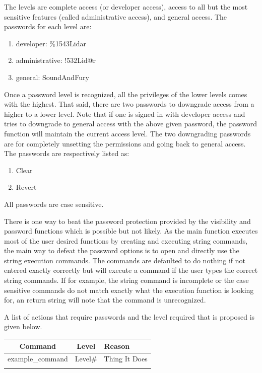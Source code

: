 The levels are complete access (or developer access), access to all but the most sensitive features (called administrative access), and general access. The passwords for each level are:

\begin{enumerate}
\item{developer: \%1543Lidar}
\item{administrative: !532Lid@r}
\item{general: SoundAndFury}
\end{enumerate}

Once a password level is recognized, all the privileges of the lower levels comes with the highest. That said, there are two passwords to downgrade access from a higher to a lower level. Note that if one is signed in with developer access and tries to downgrade to general access with the above given password, the password function will maintain the current access level. The two downgrading passwords are for completely unsetting the permissions and going back to general access. The passwords are respectively listed as:

\begin{enumerate}
\item{Clear}
\item{Revert}
\end{enumerate}

All passwords are case sensitive.

There is one way to beat the password protection provided by the visibility and password functions which is possible but not likely. As the main function executes most of the user desired functions by creating and executing string commands, the main way to defeat the password options is to open and directly use the string execution commands. The commands are defaulted to do nothing if not entered exactly correctly but will execute a command if the user types the correct string commands. If for example, the string command is incomplete or the case sensitive commands do not match exactly what the execution function is looking for, an return string will note that the command is unrecognized. 

A list of actions that require passwords and the level required that is proposed is given below.

\begin{longtable}{ccl}
Command				& Level  	& Reason										\\
\hline
example\_command & Level\# & Thing It Does	\\
\hline
\label{Tab:PasswordDetails}\end{longtable}

\newpage

